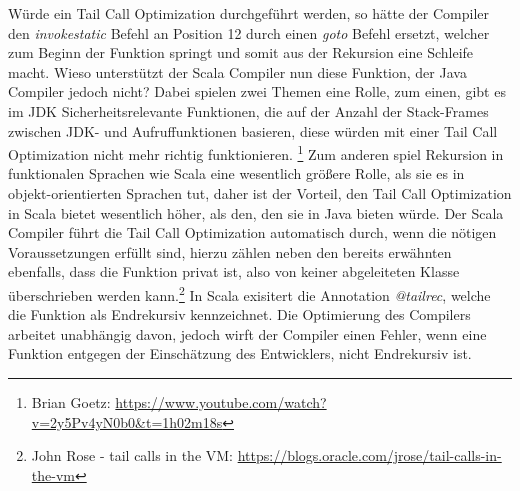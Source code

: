 \documentclass[a4paper, 11pt]{article}
\begin{document}
	Würde ein Tail Call Optimization durchgeführt werden, so hätte der Compiler den \textit{invokestatic} Befehl an Position 12 durch einen \textit{goto} Befehl ersetzt, welcher zum Beginn der Funktion springt und somit aus der Rekursion eine Schleife macht.
	Wieso unterstützt der Scala Compiler nun diese Funktion, der Java Compiler jedoch nicht? Dabei spielen zwei Themen eine Rolle, zum einen, gibt es im JDK Sicherheitsrelevante Funktionen, die auf der Anzahl der Stack-Frames zwischen JDK- und Aufruffunktionen basieren, diese würden mit einer Tail Call Optimization nicht mehr richtig funktionieren. \footnote{Brian Goetz:  \url{https://www.youtube.com/watch?v=2y5Pv4yN0b0&t=1h02m18s}}
	Zum anderen spiel Rekursion in funktionalen Sprachen wie Scala eine wesentlich größere Rolle, als sie es in objekt-orientierten Sprachen tut, daher ist der Vorteil, den Tail Call Optimization in Scala bietet wesentlich höher, als den, den sie in Java bieten würde.
	Der Scala Compiler führt die Tail Call Optimization automatisch durch, wenn die nötigen Voraussetzungen erfüllt sind, hierzu zählen neben den bereits erwähnten ebenfalls, dass die Funktion privat ist, also von keiner abgeleiteten Klasse überschrieben werden kann.\footnote{John Rose - tail calls in the VM: \url{https://blogs.oracle.com/jrose/tail-calls-in-the-vm}} In Scala exisitert die Annotation \textit{@tailrec}, welche die Funktion als Endrekursiv kennzeichnet. Die Optimierung des Compilers arbeitet unabhängig davon, jedoch wirft der Compiler einen Fehler, wenn eine Funktion entgegen der Einschätzung des Entwicklers, nicht Endrekursiv ist.
	

%  
%  
  
%  
\end{document}
